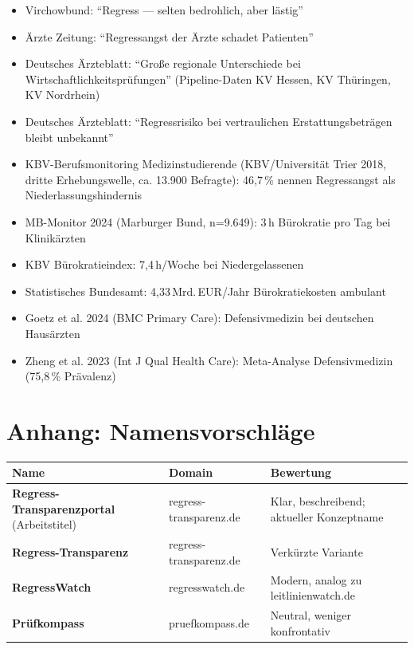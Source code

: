 \documentclass{umbruch-position}
\begin{document}
\begin{itemize}[nosep]
  \item Virchowbund: ``Regress — selten bedrohlich, aber lästig''
  \item Ärzte Zeitung: ``Regressangst der Ärzte schadet Patienten''
  \item Deutsches Ärzteblatt: ``Große regionale Unterschiede bei Wirtschaftlichkeitsprüfungen'' (Pipeline-Daten KV Hessen, KV Thüringen, KV Nordrhein)
  \item Deutsches Ärzteblatt: ``Regressrisiko bei vertraulichen Erstattungsbeträgen bleibt unbekannt''
  \item KBV-Berufsmonitoring Medizinstudierende (KBV/Universität Trier 2018, dritte Erhebungswelle, ca. 13.900 Befragte): 46,7\,\% nennen Regressangst als Niederlassungshindernis
  \item MB-Monitor 2024 (Marburger Bund, n=9.649): 3\,h Bürokratie pro Tag bei Klinikärzten
  \item KBV Bürokratieindex: 7,4\,h/Woche bei Niedergelassenen
  \item Statistisches Bundesamt: 4,33\,Mrd.\,EUR/Jahr Bürokratiekosten ambulant
  \item Goetz et al. 2024 (BMC Primary Care): Defensivmedizin bei deutschen Hausärzten
  \item Zheng et al. 2023 (Int J Qual Health Care): Meta-Analyse Defensivmedizin (75,8\,\% Prävalenz)
\end{itemize}


\section{Anhang: Namensvorschläge}

{\small
\begin{tabularx}{\textwidth}{X X X}
\toprule
\textbf{Name} & \textbf{Domain} & \textbf{Bewertung} \\
\midrule
\textbf{Regress-Transparenzportal} (Arbeitstitel) & regress-transparenz.de & Klar, beschreibend; aktueller Konzeptname \\
\textbf{Regress-Transparenz} & regress-transparenz.de & Verkürzte Variante \\
\textbf{RegressWatch} & regresswatch.de & Modern, analog zu leitlinienwatch.de \\
\textbf{Prüfkompass} & pruefkompass.de & Neutral, weniger konfrontativ \\
\bottomrule
\end{tabularx}
}
\end{document}
